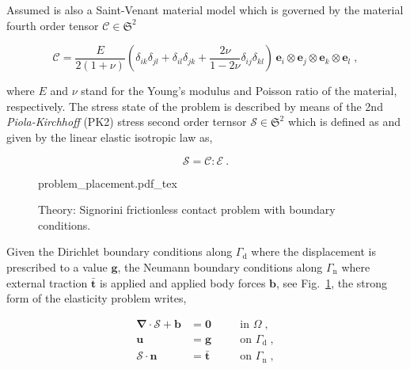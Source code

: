 \documentclass[10pt,a4paper]{article}
\begin{document}
Assumed is also a Saint-Venant material model which is governed by the material fourth order tensor $\boldsymbol{\mathcal{C}} \in \mathfrak{S}^2$

\begin{equation}
	\boldsymbol{\mathcal{C}} = \frac{E}{2 (1 + \nu)} \left( \delta_{ik} \delta_{jl} + \delta_{il} \delta_{jk} + \frac{2 \nu}{1 - 2 \nu} \delta_{ij} \delta_{kl} \right) \, \mathbf{e}_i \otimes \mathbf{e}_j \otimes \mathbf{e}_k \otimes \mathbf{e}_l \;, \label{eq:material_tensor}
\end{equation}

where $E$ and $\nu$ stand for the Young's modulus and Poisson ratio of the material, respectively. The stress state of the problem is described by means of the 2nd \textit{Piola-Kirchhoff} (PK2) stress second order ternsor $\boldsymbol{\mathcal{S}} \in \mathfrak{S}^2$ which is defined as and given by the linear elastic isotropic law as,

\begin{equation}
	\boldsymbol{\mathcal{S}} = \boldsymbol{\mathcal{C}}  : \boldsymbol{\mathcal{E}} \:.
\end{equation}

\begin{figure}[!t]
	\centering
	\footnotesize
    \def\svgwidth{0.5\textwidth}{problem_placement.pdf_tex}
	\caption{Theory: Signorini frictionless contact problem with boundary conditions.}
	\label{im:signorini_contact_problem}
\end{figure}

Given the Dirichlet boundary conditions along $\Gamma_{\text{d}}$ where the displacement is prescribed to a value $\mathbf{g}$, the Neumann boundary conditions along $\Gamma_{\text{n}}$ where external traction $\bar{\mathbf{t}}$ is applied and applied body forces $\mathbf{b}$, see Fig.~\ref{im:signorini_contact_problem}, the strong form of the elasticity problem writes,

\begin{subequations}
	\begin{alignat}{2}
		\boldsymbol{\nabla} \cdot \boldsymbol{\mathcal{S}} + \mathbf{b} &= \mathbf{0} \quad &&\text{in } \Omega \;, \label{eq:strong_equilibrium} \\
		\mathbf{u} &= \mathbf{g} &&\text{on } \Gamma_{\text{d}} \;, \label{eq:prescribed_displacement} \\
		\boldsymbol{\mathcal{S}} \cdot \mathbf{n} &= \bar{\mathbf{t}} &&\text{on } \Gamma_{\text{n}} \;,
	\end{alignat}
	\label{eq:strong_formulation}
\end{subequations}
\end{document}
